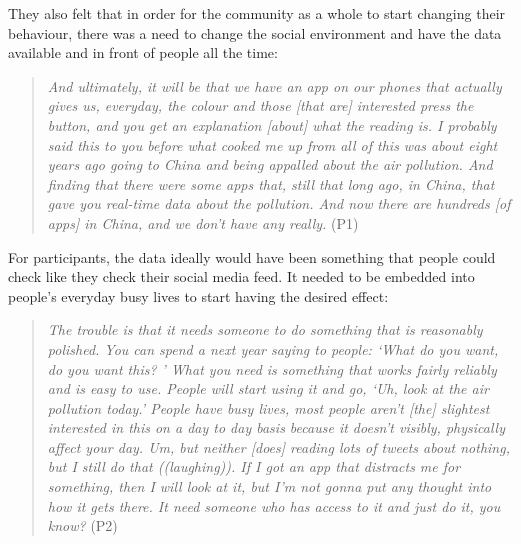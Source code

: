 They also felt that in order for the community as a whole to start changing their behaviour, there was a need to change the social environment and have the data available and in front of people all the time:
\begin{quote}
    \textit{And ultimately, it will be that we have an app on our phones that actually gives us, everyday, the colour and those [that are] interested press the button, and you get an explanation [about] what the reading is. I probably said this to you before what cooked me up from all of this was about eight years ago going to China and being appalled about the air pollution. And finding that there were some apps that, still that long ago, in China, that gave you real-time data about the pollution. And now there are hundreds [of apps] in China, and we don't have any really.} (P1)
\end{quote}

For participants, the data ideally would have been something that people could check like they check their social media feed. It needed to be embedded into people's everyday busy lives to start having the desired effect:
\begin{quote}
    \textit{The trouble is that it needs someone to do something that is reasonably polished. You can spend a next year saying to people: `What do you want, do you want this? ' What you need is something that works fairly reliably and is easy to use. People will start using it and go, `Uh, look at the air pollution today.' People have busy lives, most people aren't [the] slightest interested in this on a day to day basis because it doesn't visibly, physically affect your day. Um, but neither [does] reading lots of tweets about nothing, but I still do that ((laughing)). If I got an app that distracts me for something, then I will look at it, but I'm not gonna put any thought into how it gets there. It need someone who has access to it and just do it, you know?} (P2)
\end{quote}

